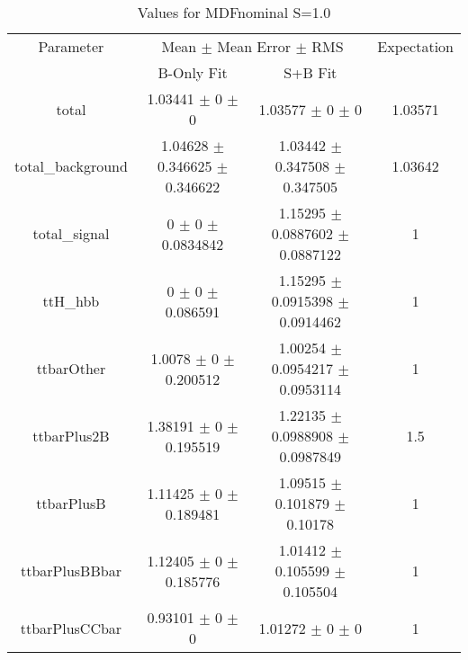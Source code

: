 \begin{table}
\centering
\caption{Values for MDFnominal S=1.0}
\begin{tabular}{cccc}
\toprule
Parameter & \multicolumn{2}{c}{Mean $\pm$ Mean Error $\pm$ RMS} & Expectation\\
 & B-Only Fit & S+B Fit & \\
\midrule
total & \num{1.03441} $\pm$ \num{0} $\pm$ \num{0} & \num{1.03577} $\pm$ \num{0} $\pm$ \num{0} & \num{1.03571}\\
total\_background & \num{1.04628} $\pm$ \num{0.346625} $\pm$ \num{0.346622} & \num{1.03442} $\pm$ \num{0.347508} $\pm$ \num{0.347505} & \num{1.03642}\\
total\_signal & \num{0} $\pm$ \num{0} $\pm$ \num{0.0834842} & \num{1.15295} $\pm$ \num{0.0887602} $\pm$ \num{0.0887122} & \num{1}\\
ttH\_hbb & \num{0} $\pm$ \num{0} $\pm$ \num{0.086591} & \num{1.15295} $\pm$ \num{0.0915398} $\pm$ \num{0.0914462} & \num{1}\\
ttbarOther & \num{1.0078} $\pm$ \num{0} $\pm$ \num{0.200512} & \num{1.00254} $\pm$ \num{0.0954217} $\pm$ \num{0.0953114} & \num{1}\\
ttbarPlus2B & \num{1.38191} $\pm$ \num{0} $\pm$ \num{0.195519} & \num{1.22135} $\pm$ \num{0.0988908} $\pm$ \num{0.0987849} & \num{1.5}\\
ttbarPlusB & \num{1.11425} $\pm$ \num{0} $\pm$ \num{0.189481} & \num{1.09515} $\pm$ \num{0.101879} $\pm$ \num{0.10178} & \num{1}\\
ttbarPlusBBbar & \num{1.12405} $\pm$ \num{0} $\pm$ \num{0.185776} & \num{1.01412} $\pm$ \num{0.105599} $\pm$ \num{0.105504} & \num{1}\\
ttbarPlusCCbar & \num{0.93101} $\pm$ \num{0} $\pm$ \num{0} & \num{1.01272} $\pm$ \num{0} $\pm$ \num{0} & \num{1}\\
\bottomrule
\end{tabular}
\end{table}